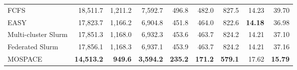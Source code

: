 \documentclass[conference]{IEEEtran}
\begin{document}
\begin{table}[t]
{\begin{tabular}{lrrrrrrrr}
FCFS & 18{,}511.7 & 1{,}211.2 & 7{,}592.7 & 496.8 & 482.0 & 827.5 & 14.23 & 39.70 \\
EASY & 17{,}823.7 & 1{,}166.2 & 6{,}904.8 & 451.8 & 464.0 & 822.6 & \textbf{14.18} & 36.98 \\
Multi-cluster Slurm & 17{,}851.3 & 1{,}168.0 & 6{,}932.3 & 453.6 & 463.7 & 824.2 & 14.21 & 37.10 \\
Federated Slurm & 17{,}856.1 & 1{,}168.3 & 6{,}937.1 & 453.9 & 463.7 & 824.2 & 14.21 & 37.16 \\
MOSPACE & \textbf{14{,}513.2} & \textbf{949.6} & \textbf{3{,}594.2} & \textbf{235.2} & \textbf{171.2} & \textbf{579.1} & 17.62 & \textbf{15.79} \\
\bottomrule
\end{tabular}%
}
\end{table}
\end{document}
